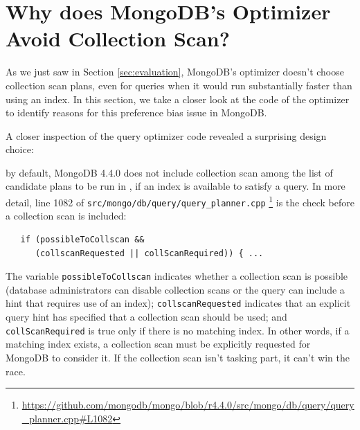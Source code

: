 \section{Why does MongoDB's \approachName Optimizer Avoid Collection Scan?}
\label{sec:rootcauseanalysis}
As we just saw in Section \ref{sec:evaluation}, MongoDB's \approachName optimizer doesn't choose collection scan plans, even for queries when it would run substantially faster than using an index. In this section, we take a closer look at the code of the optimizer to identify reasons for this preference bias issue in MongoDB.

A closer inspection of the query optimizer code revealed a surprising design choice:

by default, MongoDB 4.4.0 does not include collection scan among the list of candidate plans to be run in \approachName, if an index is available to satisfy a query.  In more detail, line 1082 of \texttt{src/\-mongo/\-db/\-query/\-query\_planner.cpp} \footnote{\url{https://github.com/mongodb/mongo/blob/r4.4.0/src/mongo/db/query/query_planner.cpp\#L1082}} is the check before a collection scan is included:

\begin{verbatim}
   if (possibleToCollscan &&
      (collscanRequested || collScanRequired)) { ...
\end{verbatim}

The variable \texttt{possibleToCollscan} indicates whether a collection scan is possible (database administrators can disable collection scans or the query can include a hint that requires use of an index); \texttt{collscanRequested} indicates that an explicit query hint has specified that a collection scan should be used; and \texttt{collScanRequired} is true only if there is no matching index.  In other words, if a matching index exists, a collection scan must be explicitly requested for MongoDB to consider it.  If the collection scan isn't tasking part, it can't win the race.

